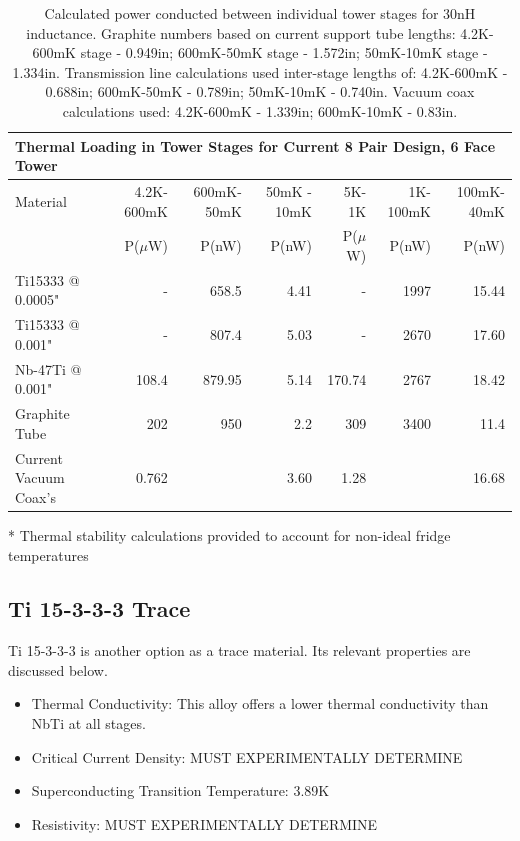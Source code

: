 \documentclass{report}
\begin{document}
\begin{table}[ht]
\centering
\begin{threeparttable}
{\footnotesize\rm\begin{tabular}{l|rrrrrr}
  \multicolumn{7}{l}{{\large Thermal Loading in Tower Stages for Current 8 Pair Design, 6 Face Tower}}\\
\toprule
 {\normalsize Material} & 4.2K-600mK & 600mK-50mK & 50mK - 10mK & 5K-1K\tnote{*} & 1K-100mK\tnote{*} & 100mK-40mK\tnote{*} \\
  &P($\mu$W)&P(nW)&P(nW)&P($\mu$W)& P(nW) & P(nW) \\ \hline\hline
  Ti15333 @ 0.0005" & - & 658.5 & 4.41 & - & 1997 & 15.44 \\
  Ti15333 @ 0.001" & - & 807.4 & 5.03 & - & 2670 & 17.60 \\
  Nb-47Ti @ 0.001" & 108.4 & 879.95 & 5.14  & 170.74 & 2767 & 18.42 \\
  Graphite Tube & 202 & 950 & 2.2 & 309 & 3400 & 11.4 \\
  Current Vacuum Coax's & 0.762 & \multicolumn{2}{r}{3.60} & 1.28 & \multicolumn{2}{r}{16.68} \\
\bottomrule
\end{tabular}
\begin{tablenotes}
   \item[*]{Thermal stability calculations provided to account for non-ideal fridge temperatures}
\end{tablenotes}}
\caption{Calculated power conducted between individual tower stages for 30nH inductance. Graphite numbers based on current support tube lengths: 4.2K-600mK stage - 0.949in; 600mK-50mK
stage - 1.572in; 50mK-10mK stage - 1.334in. Transmission line calculations used inter-stage lengths of: 4.2K-600mK - 0.688in; 600mK-50mK - 0.789in; 50mK-10mK - 0.740in. Vacuum coax
calculations used: 4.2K-600mK - 1.339in; 600mK-10mK - 0.83in. }
\end{threeparttable}
\end{table}

\subsection{Ti 15-3-3-3 Trace}
Ti 15-3-3-3 is another option as a trace material. Its relevant properties are discussed below.
\begin{itemize}
\item Thermal Conductivity: This alloy offers a lower thermal conductivity than NbTi at all stages.
\item Critical Current Density: MUST EXPERIMENTALLY DETERMINE
\item Superconducting Transition Temperature: 3.89K
\item Resistivity: MUST EXPERIMENTALLY DETERMINE
\end{itemize}
\end{document}
